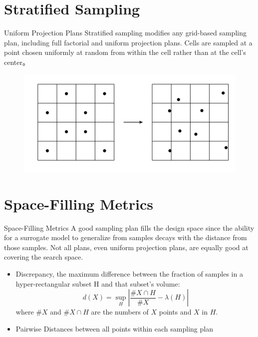 \documentclass{beamer}
\begin{document}
\section{Stratified Sampling}
\begin{frame}{Uniform Projection Plans}
Stratified sampling modifies any grid-based sampling plan, including full factorial and uniform projection plans. Cells are sampled at a point chosen uniformly at random from within the cell rather than at the cell’s center。
\begin{figure}
\centering
\includegraphics[width=120mm]{Figs/strafied.jpeg}
\end{figure} 
\end{frame}


\section{Space-Filling Metrics}
\begin{frame}{Space-Filling Metrics}
A good sampling plan fills the design space since the ability for a surrogate model to generalize from samples decays with the distance from those samples. Not all plans, even uniform projection plans, are equally good at covering the search space. 
\begin{itemize}
    \item Discrepancy, the maximum difference between the fraction of samples in a hyper-rectangular subset H and that subset’s volume:
    \begin{equation*}
        d(X) = \underset{H}{\sup} |\frac{\#X\cap H}{\#X} - \lambda(H)|
    \end{equation*}
    where $\#X$ and $\#X \cap H$ are the numbers of $X$ points and $X$ in $H$. 
    \item Pairwise Distances between all points within each sampling plan
    
\end{itemize}


\end{frame}
\end{document}
